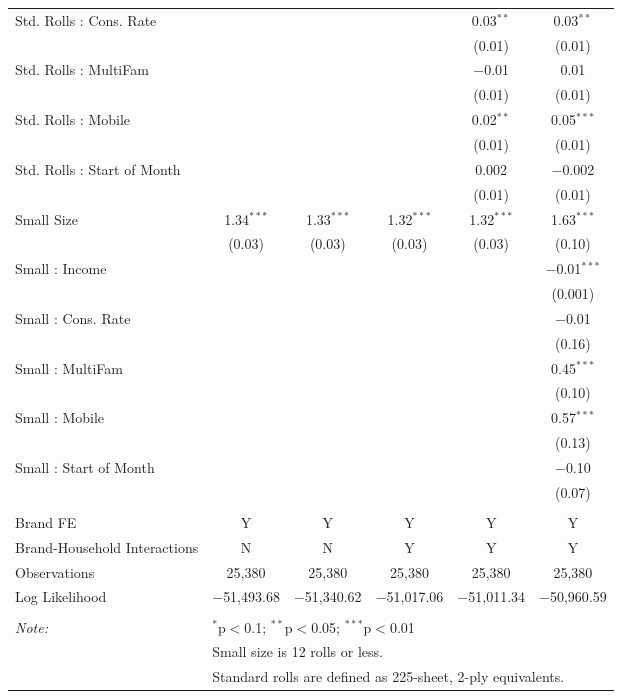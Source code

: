 \begin{table}[!htbp]
\begin{tabular}{@{\extracolsep{5pt}}lccccc}
  Std. Rolls : Cons. Rate &  &  &  & 0.03$^{**}$ & 0.03$^{**}$ \\ 
  &  &  &  & (0.01) & (0.01) \\ 
  Std. Rolls : MultiFam &  &  &  & $-$0.01 & 0.01 \\ 
  &  &  &  & (0.01) & (0.01) \\ 
  Std. Rolls : Mobile &  &  &  & 0.02$^{**}$ & 0.05$^{***}$ \\ 
  &  &  &  & (0.01) & (0.01) \\ 
  Std. Rolls : Start of Month &  &  &  & 0.002 & $-$0.002 \\ 
  &  &  &  & (0.01) & (0.01) \\ 
  Small Size & 1.34$^{***}$ & 1.33$^{***}$ & 1.32$^{***}$ & 1.32$^{***}$ & 1.63$^{***}$ \\ 
  & (0.03) & (0.03) & (0.03) & (0.03) & (0.10) \\ 
  Small : Income &  &  &  &  & $-$0.01$^{***}$ \\ 
  &  &  &  &  & (0.001) \\ 
  Small : Cons. Rate &  &  &  &  & $-$0.01 \\ 
  &  &  &  &  & (0.16) \\ 
  Small : MultiFam &  &  &  &  & 0.45$^{***}$ \\ 
  &  &  &  &  & (0.10) \\ 
  Small : Mobile &  &  &  &  & 0.57$^{***}$ \\ 
  &  &  &  &  & (0.13) \\ 
  Small : Start of Month &  &  &  &  & $-$0.10 \\ 
  &  &  &  &  & (0.07) \\ 
 \hline \\[-1.8ex] 
Brand FE & Y & Y & Y & Y & Y \\ 
Brand-Household Interactions & N & N & Y & Y & Y \\ 
Observations & 25,380 & 25,380 & 25,380 & 25,380 & 25,380 \\ 
Log Likelihood & $-$51,493.68 & $-$51,340.62 & $-$51,017.06 & $-$51,011.34 & $-$50,960.59 \\ 
\hline 
\hline \\[-1.8ex] 
\textit{Note:}  & \multicolumn{5}{l}{$^{*}$p$<$0.1; $^{**}$p$<$0.05; $^{***}$p$<$0.01} \\ 
 & \multicolumn{5}{l}{Small size is 12 rolls or less.} \\ 
 & \multicolumn{5}{l}{Standard rolls are defined as 225-sheet, 2-ply equivalents.} \\ 
\end{tabular} 
\end{table} 
